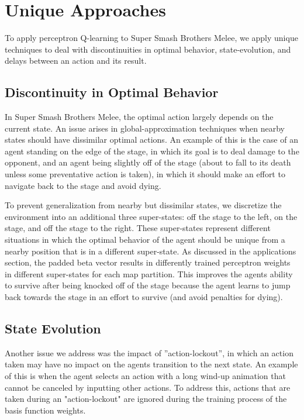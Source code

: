 \section{Unique Approaches}

To apply perceptron Q-learning to Super Smash Brothers Melee, we apply unique techniques to deal with discontinuities in optimal behavior, state-evolution, and delays between an action and its result.

\subsection{Discontinuity in Optimal Behavior}
In Super Smash Brothers Melee, the optimal action largely depends on the current state. An issue arises in global-approximation techniques when nearby states should have dissimilar optimal actions. An example of this is the case of an agent standing on the edge of the stage, in which its goal is to deal damage to the opponent, and an agent being slightly off of the stage (about to fall to its death unless some preventative action is taken), in which it should make an effort to navigate back to the stage and avoid dying. 

To prevent generalization from nearby but dissimilar states, we discretize the environment into an additional three super-states: off the stage to the left, on the stage, and off the stage to the right. These super-states represent different situations in which the optimal behavior of the agent should be unique from a nearby position that is in a different super-state. As discussed in the applications section, the padded beta vector results in differently trained perceptron weights in different super-states for each map partition. This improves the agents ability to survive after being knocked off of the stage because the agent learns to jump back towards the stage in an effort to survive (and avoid penalties for dying). 


\subsection{State Evolution}
Another issue we address was the impact of ”action-lockout”, in which an action taken may have no impact on the agents transition to the next state. An example of this is when the agent selects an action with a long wind-up animation that cannot be canceled by inputting other actions. To address this, actions that are taken during an "action-lockout" are ignored during the training process of the basis function weights. 

